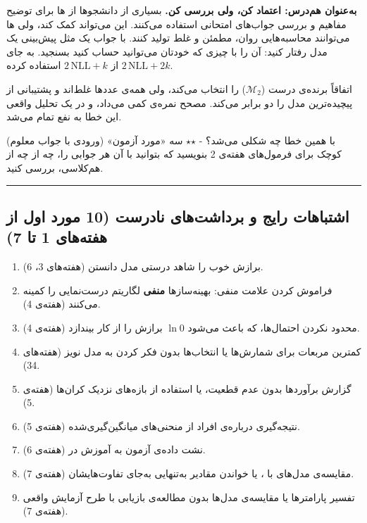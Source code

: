 \textbf{ به‌عنوان هم‌درس: اعتماد کن، ولی بررسی کن.} بسیاری از
دانشجوها از ها برای توضیح مفاهیم و بررسی جواب‌های امتحانی استفاده
می‌کنند. این می‌تواند کمک کند، ولی ها می‌توانند محاسبه‌هایی روان،
مطمئن و غلط تولید کنند. با جواب یک  مثل پیش‌بینی یک مدل رفتار
کنید: آن را با چیزی که خودتان می‌توانید حساب کنید بسنجید.  به
جای \(2\,\mathrm{NLL} + 2k\) از \(2\,\mathrm{NLL} + k\) استفاده کرده.

 اتفاقاً برنده‌ی درست (\(\mathcal{M}_2\)) را انتخاب می‌کند، ولی
همه‌ی عددها غلط‌اند و پشتیبانی از پیچیده‌ترین مدل را دو برابر می‌کند. مصحح
نمره‌ی کمی می‌داد، و در یک تحلیل واقعی این خطا به نفع 
تمام می‌شد.

 با همین خطا چه شکلی می‌شد؟ - \ensuremath{\star}\ensuremath{\star} سه «مورد آزمون» (ورودی با جواب
معلوم) کوچک برای فرمول‌های  هفته‌ی 2 بنویسید که بتوانید با آن هر
جوابی را، چه از  چه از هم‌کلاسی، بررسی کنید.

\begin{center}\rule{0.5\linewidth}{0.5pt}\end{center}

\subsection{اشتباهات رایج و برداشت‌های نادرست (10 مورد اول از هفته‌های 1
تا 7)}

\begin{enumerate}
\def\labelenumi{\arabic{enumi}.}
\tightlist
\item
  برازش خوب را شاهد درستی مدل دانستن (هفته‌های 3، 6).
\item
  فراموش کردن علامت منفی: بهینه‌سازها \textbf{منفی} لگاریتم درست‌نمایی را
  کمینه می‌کنند (هفته‌ی 4).
\item
  محدود نکردن احتمال‌ها، که باعث می‌شود \(\ln 0\) برازش را از کار بیندازد
  (هفته‌ی 4).
\item
  کمترین مربعات برای شمارش‌ها یا انتخاب‌ها بدون فکر کردن به مدل نویز
  (هفته‌های 3\lr{--}4).
\item
  گزارش برآوردها بدون عدم قطعیت، یا استفاده از بازه‌های  نزدیک
  کران‌ها (هفته‌ی 5).
\item
  نتیجه‌گیری درباره‌ی افراد از منحنی‌های میانگین‌گیری‌شده (هفته‌ی 5).
\item
  نشت داده‌ی آزمون به آموزش در  (هفته‌ی 6).
\item
  مقایسه‌ی مدل‌های  با ، یا خواندن مقادیر 
  به‌تنهایی به‌جای تفاوت‌هایشان (هفته‌ی 7).
\item
  تفسیر پارامترها یا مقایسه‌ی مدل‌ها بدون مطالعه‌ی بازیابی با طرح آزمایش
  واقعی (هفته‌ی 7).
\end{enumerate}

